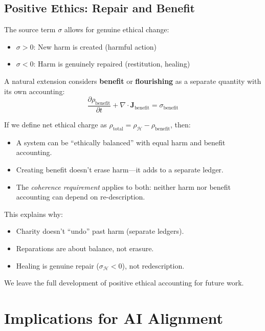 \documentclass[12pt,letterpaper]{article}
\theoremstyle{definition}
\theoremstyle{remark}
\newcommand{\harm}{\mathcal{H}}
\begin{document}
\subsection{Positive Ethics: Repair and Benefit}

The source term $\sigma$ allows for genuine ethical change:

\begin{itemize}
    \item $\sigma > 0$: New harm is created (harmful action)
    \item $\sigma < 0$: Harm is genuinely repaired (restitution, healing)
\end{itemize}

A natural extension considers \textbf{benefit} or \textbf{flourishing} as a separate quantity with its own accounting:
\begin{equation}
\frac{\partial \rho_{\text{benefit}}}{\partial t} + \nabla \cdot \mathbf{J}_{\text{benefit}} = \sigma_{\text{benefit}}
\end{equation}

If we define net ethical charge as $\rho_{\text{total}} = \rho_\harm - \rho_{\text{benefit}}$, then:
\begin{itemize}
    \item A system can be ``ethically balanced'' with equal harm and benefit accounting.
    \item Creating benefit doesn't erase harm---it adds to a separate ledger.
    \item The \textit{coherence requirement} applies to both: neither harm nor benefit accounting can depend on re-description.
\end{itemize}

This explains why:
\begin{itemize}
    \item Charity doesn't ``undo'' past harm (separate ledgers).
    \item Reparations are about balance, not erasure.
    \item Healing is genuine repair ($\sigma_\harm < 0$), not redescription.
\end{itemize}

We leave the full development of positive ethical accounting for future work.

\section{Implications for AI Alignment}
\end{document}
